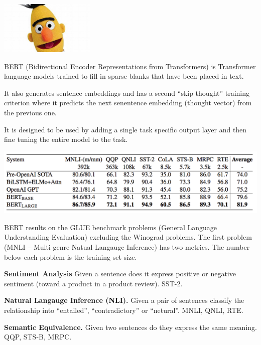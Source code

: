{

\centerline{\includegraphics[height = 1in]{../images/BERTb}}

\vfill
BERT (Bidirectional Encoder Representations from Transformers) is Transformer language models trained to fill in sparse blanks that have been placed in text.

\vfill
It also generates sentence embeddings and has a second ``skip thought'' training criterion where it predicts the next senentence embedding (thought vector)
from the previous one.

\vfill It is designed to be used by adding a single task specific output layer and then fine tuning the entire model to the task.


\centerline{\includegraphics[width = 9in]{../images/BERTa}}

BERT results on the GLUE benchmark problems (General Language Understanding Evaluation) excluding the Winograd problems.
The first problem (MNLI -- Multi genre Natual Langauge Inference) has two metrics.  The number below each problem is the training set size.


{\bf Sentiment Analysis} Given a sentence does it express positive or negative sentiment (toward a product in a product review). {\color{red} SST-2}.

\vfill
{\bf Natural Langauge Inference (NLI).}
Given a pair of sentences classify the relationship into ``entailed'', ``contradictory'' or ``netural''. {\color{red} MNLI, QNLI, RTE}.

\vfill
{\bf Semantic Equivalence.} Given two sentences do they express the same meaning. {\color{red} QQP, STS-B, MRPC}.

}
